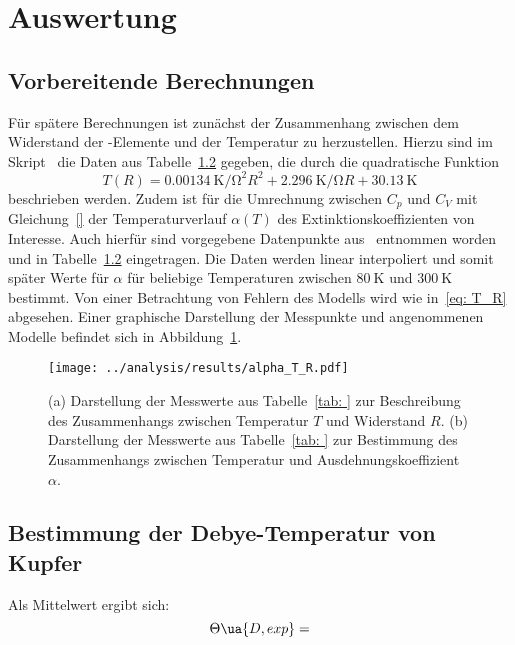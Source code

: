 \section{Auswertung}



\subsection{Vorbereitende Berechnungen}
Für spätere Berechnungen ist zunächst der Zusammenhang zwischen dem Widerstand der -Elemente und der Temperatur 
zu herzustellen. Hierzu sind im Skript~\cite{anleitung47} die Daten aus Tabelle~\ref{} gegeben, die durch die quadratische 
Funktion
\begin{equation}
    T(R) = \SI{0.00134}{\kelvin \per \ohm\squared} R^2 + \SI{2.296}{\kelvin \per \ohm} R + \SI{30.13}{\kelvin}
    \label{eq: T_R}
\end{equation}
beschrieben werden. Zudem ist für die Umrechnung zwischen $C_p$ und $C_V$ mit Gleichung~\eqref{} der Temperaturverlauf 
$\alpha(T)$ des Extinktionskoeffizienten von Interesse. Auch hierfür sind vorgegebene Datenpunkte aus~\cite{} entnommen 
worden und in Tabelle~\ref{} eingetragen. Die Daten werden linear interpoliert und somit später Werte für $\alpha$ für 
beliebige Temperaturen zwischen $\SI{80}{\kelvin}$ und $\SI{300}{\kelvin}$ bestimmt. Von einer Betrachtung von Fehlern 
des Modells wird wie in~\eqref{eq: T_R} abgesehen. Einer graphische Darstellung der Messpunkte und angenommenen 
Modelle befindet sich in Abbildung~\ref{fig: alpha_T_R}.
\begin{figure}
\centering
\texttt{[image: ../analysis/results/alpha\_T\_R.pdf]}
\caption{(a) Darstellung der Messwerte aus Tabelle~\ref{tab: } zur Beschreibung des Zusammenhangs zwischen Temperatur 
        $T$ und Widerstand $R$.
        (b) Darstellung der Messwerte aus Tabelle~\ref{tab: } zur Bestimmung des Zusammenhangs zwischen Temperatur und Ausdehnungskoeffizient $\alpha$.}
\label{fig: alpha_T_R}
\end{figure}


\subsection{Bestimmung der Debye-Temperatur von Kupfer}


Als Mittelwert ergibt sich: 
\begin{equation}
        \Theta\ua{D, exp} = 
\end{equation}